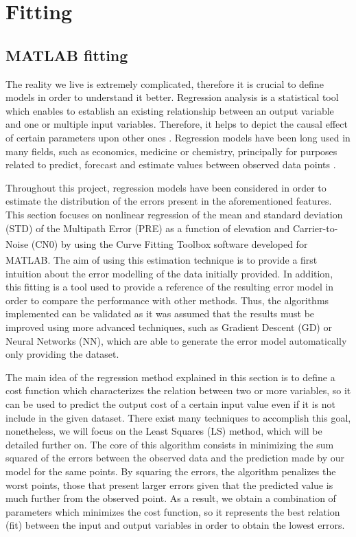 \documentclass[a4paper, report, oneside, UKenglish]{memoir}
\begin{document}
\chapter{Fitting}\label{ch:fitting}

\section{MATLAB fitting}\label{matlabfit}

The reality we live is extremely complicated, therefore it is crucial to define models in order to understand it better. Regression analysis is a statistical tool which enables to establish an existing relationship between an output variable and one or multiple input variables. Therefore, it helps to depict the causal effect of certain parameters upon other ones \cite{IntroToRegresAna}. Regression models have been long used in many fields, such as economics, medicine or chemistry, principally for purposes related to predict, forecast and estimate values between observed data points \cite{MathWorksRegression}.  

Throughout this project, regression models have been considered in order to estimate the distribution of the errors present in the aforementioned features. This section focuses on nonlinear regression of the mean and standard deviation (STD) of the Multipath Error (PRE) as a function of elevation and Carrier-to-Noise (CN0) by using the Curve Fitting Toolbox\textsuperscript{\tiny\texttrademark} software developed for MATLAB\textsuperscript{\tiny\textregistered}. The aim of using this estimation technique is to provide a first intuition about the error modelling of the data initially provided. In addition, this fitting is a tool used to provide a reference of the resulting error model in order to compare the performance with other methods. Thus, the algorithms implemented can be validated as it was assumed that the results must be improved using more advanced techniques, such as Gradient Descent (GD) or Neural Networks (NN), which are able to generate the error model automatically only providing the dataset. 

The main idea of the regression method explained in this section is to define a cost function which characterizes the relation between two or more variables, so it can be used to predict the output cost of a certain input value even if it is not include in the given dataset. There exist many techniques to accomplish this goal, nonetheless, we will focus on the Least Squares (LS) method, which will be detailed further on. The core of this algorithm consists in minimizing the sum squared of the errors between the observed data and the prediction made by our model for the same points. By squaring the errors, the algorithm penalizes the worst points, those that present larger errors given that the predicted value is much further from the observed point. As a result, we obtain a combination of parameters which minimizes the cost function, so it represents the best relation (fit) between the input and output variables in order to obtain the lowest errors. 
\end{document}
